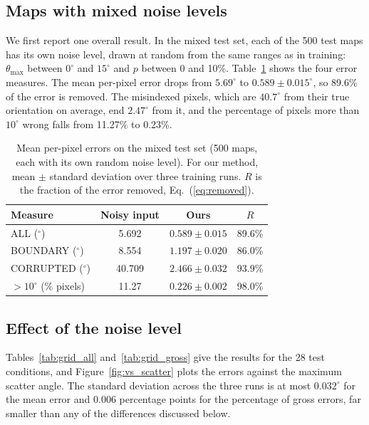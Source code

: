 \subsection{Maps with mixed noise levels}

We first report one overall result. In the mixed test set, each of the 500
test maps has its own noise level, drawn at random from the same ranges as in
training: $\theta_{\max}$ between $0^\circ$ and $15^\circ$ and $p$ between 0
and 10\%. Table~\ref{tab:mixed} shows the four error measures. The mean
per-pixel error drops from $5.69^\circ$ to $0.589 \pm 0.015^\circ$, so 89.6\%
of the error is removed. The misindexed pixels, which are $40.7^\circ$ from
their true orientation on average, end $2.47^\circ$ from it, and the
percentage of pixels more than $10^\circ$ wrong falls from 11.27\% to 0.23\%.

\begin{table}[t]
  \centering
  \caption{Mean per-pixel errors on the mixed test set (500 maps, each with
    its own random noise level). For our method, mean $\pm$ standard deviation
    over three training runs. $R$ is the fraction of the error removed,
    Eq.~(\ref{eq:removed}).}
  \label{tab:mixed}
  \small
  \begin{tabular}{@{}lccc@{}}
    \toprule
    Measure & Noisy input & Ours & $R$ \\
    \midrule
    ALL ($^\circ$)          & 5.692  & $0.589 \pm 0.015$ & 89.6\% \\
    BOUNDARY ($^\circ$)     & 8.554  & $1.197 \pm 0.020$ & 86.0\% \\
    CORRUPTED ($^\circ$)    & 40.709 & $2.466 \pm 0.032$ & 93.9\% \\
    $>10^\circ$ (\% pixels) & 11.27  & $0.226 \pm 0.002$ & 98.0\% \\
    \bottomrule
  \end{tabular}
\end{table}

\subsection{Effect of the noise level}

Tables~\ref{tab:grid_all} and~\ref{tab:grid_gross} give the results for the
28 test conditions, and Figure~\ref{fig:vs_scatter} plots the errors against
the maximum scatter angle. The standard deviation across the three runs is at
most $0.032^\circ$ for the mean error and 0.006 percentage points for the
percentage of gross errors, far smaller than any of the differences discussed
below.

